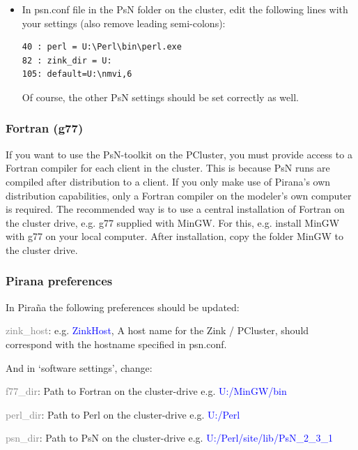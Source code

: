 \documentclass[a4,11pt]{report} \usepackage[pdftex]{graphicx}
\begin{document}
{{{{\begin{itemize}
\item In psn.conf file in the PsN folder on the cluster, edit the
following lines with your settings (also remove leading semi-colons):
\begin{verbatim}
40 : perl = U:\Perl\bin\perl.exe
82 : zink_dir = U:
105: default=U:\nmvi,6
\end{verbatim} Of course, the other PsN settings should be set correctly as well.

\end{itemize}

\subsubsection*{Fortran (g77)} If you want to use the PsN-toolkit on
the PCluster, you must provide access to a Fortran compiler for each
client in the cluster. This is because PsN runs are compiled after
distribution to a client. If you only make use of Pirana's own
distribution capabilities, only a Fortran compiler on the modeler's
own computer is required. The recommended way is to use a central
installation of Fortran on the cluster drive, e.g. g77 supplied with
MinGW. For this, e.g. install MinGW with g77 on your local
computer. After installation, copy the folder MinGW to the cluster
drive.

\subsubsection*{Pirana preferences} In Pira\~na the following
preferences should be updated:
\begin{description}
	\item \textcolor{Grey}{zink\_host}:
e.g. \textcolor{Blue}{ZinkHost}, A host name for the Zink / PCluster,
should correspond with the hostname specified in psn.conf.
\end{description}
\noindent And in `software settings', change:
\begin{description}
  \item \textcolor{Grey}{f77\_dir}: Path to Fortran on the
cluster-drive e.g.  \textcolor{Blue}{U:/MinGW/bin}
  \item \textcolor{Grey}{perl\_dir}: Path to Perl on the cluster-drive
e.g.  \textcolor{Blue}{U:/Perl}
  \item \textcolor{Grey}{psn\_dir}: Path to PsN on the cluster-drive
e.g.  \textcolor{Blue}{U:/Perl/site/lib/PsN\_2\_3\_1}
\end{description}

}}}}
\end{document}
